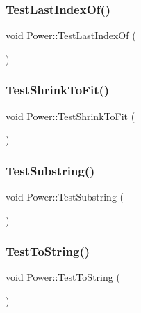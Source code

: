 \mbox{\label{namespace_power_a11303f4f04e214f86e20de0b5b7c01fa}} 
\subsubsection{\texorpdfstring{Test\+Last\+Index\+Of()}{TestLastIndexOf()}}
{\footnotesize\ttfamily void Power\+::\+Test\+Last\+Index\+Of (\begin{DoxyParamCaption}{ }\end{DoxyParamCaption})}

\mbox{\label{namespace_power_ae23123cd183d3656e9fcdb0ca4b54aab}} 
\subsubsection{\texorpdfstring{Test\+Shrink\+To\+Fit()}{TestShrinkToFit()}}
{\footnotesize\ttfamily void Power\+::\+Test\+Shrink\+To\+Fit (\begin{DoxyParamCaption}{ }\end{DoxyParamCaption})}

\mbox{\label{namespace_power_a15f3bf497eb9f54378f0e2b590802bd4}} 
\subsubsection{\texorpdfstring{Test\+Substring()}{TestSubstring()}}
{\footnotesize\ttfamily void Power\+::\+Test\+Substring (\begin{DoxyParamCaption}{ }\end{DoxyParamCaption})}

\mbox{\label{namespace_power_a089aad37a74a89e886f605a3ea478664}} 
\subsubsection{\texorpdfstring{Test\+To\+String()}{TestToString()}}
{\footnotesize\ttfamily void Power\+::\+Test\+To\+String (\begin{DoxyParamCaption}{ }\end{DoxyParamCaption})}

